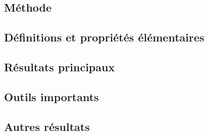 \documentclass[12pt,a4paper]{article}
\begin{document}
\subsection*{Méthode}

\subsection*{Définitions et propriétés élémentaires}

\subsection*{Résultats principaux}

\subsection*{Outils importants}


\subsection*{Autres résultats}
\end{document}
